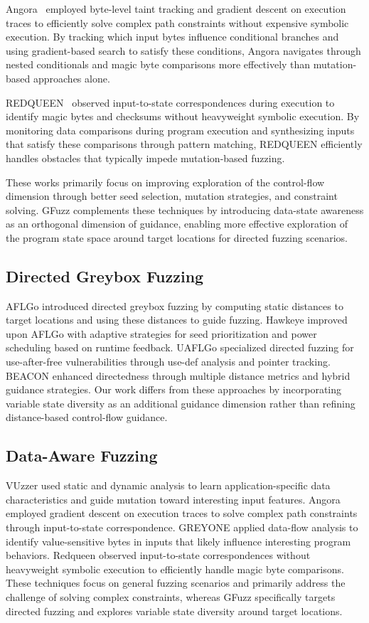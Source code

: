 \documentclass[review]{elsarticle}
\begin{document}
Angora~\cite{angora} employed byte-level taint tracking and gradient descent on execution traces to efficiently solve complex path constraints without expensive symbolic execution. By tracking which input bytes influence conditional branches and using gradient-based search to satisfy these conditions, Angora navigates through nested conditionals and magic byte comparisons more effectively than mutation-based approaches alone.

REDQUEEN~\cite{redqueen} observed input-to-state correspondences during execution to identify magic bytes and checksums without heavyweight symbolic execution. By monitoring data comparisons during program execution and synthesizing inputs that satisfy these comparisons through pattern matching, REDQUEEN efficiently handles obstacles that typically impede mutation-based fuzzing.

These works primarily focus on improving exploration of the control-flow dimension through better seed selection, mutation strategies, and constraint solving. GFuzz complements these techniques by introducing data-state awareness as an orthogonal dimension of guidance, enabling more effective exploration of the program state space around target locations for directed fuzzing scenarios.

\subsection{Directed Greybox Fuzzing}

AFLGo introduced directed greybox fuzzing by computing static distances to target locations and using these distances to guide fuzzing. Hawkeye improved upon AFLGo with adaptive strategies for seed prioritization and power scheduling based on runtime feedback. UAFLGo specialized directed fuzzing for use-after-free vulnerabilities through use-def analysis and pointer tracking. BEACON enhanced directedness through multiple distance metrics and hybrid guidance strategies. Our work differs from these approaches by incorporating variable state diversity as an additional guidance dimension rather than refining distance-based control-flow guidance.

\subsection{Data-Aware Fuzzing}

VUzzer used static and dynamic analysis to learn application-specific data characteristics and guide mutation toward interesting input features. Angora employed gradient descent on execution traces to solve complex path constraints through input-to-state correspondence. GREYONE applied data-flow analysis to identify value-sensitive bytes in inputs that likely influence interesting program behaviors. Redqueen observed input-to-state correspondences without heavyweight symbolic execution to efficiently handle magic byte comparisons. These techniques focus on general fuzzing scenarios and primarily address the challenge of solving complex constraints, whereas GFuzz specifically targets directed fuzzing and explores variable state diversity around target locations.
\end{document}
